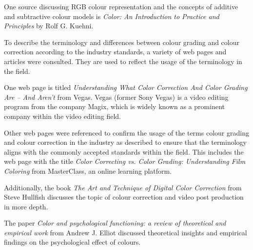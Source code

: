 \documentclass[../MasterThesis.tex]{subfiles}
\begin{document}
	
	\begin{description}[font=\color{RedViolet!80!black}, style=nextline]
		
		\item[RGB representation] 
		
		One source discussing RGB colour representation and the concepts of additive and subtractive colour models is \textit{Color: An Introduction to Practice and Principles} by Rolf G. Kuehni.~\cite{colourRGB}
		
		
		
		
		\item[Colour grading] 
		
		To describe the terminology and differences between colour grading and colour correction according to the industry standards, a variety of web pages and articles were consulted. They are used to reflect the usage of the terminology in the field. 
		
		One web page is titled \textit{Understanding What Color Correction And Color Grading Are – And Aren’t} from Vegas. Vegas (former Sony Vegas) is a video editing program from the company Magix, which is widely known as a prominent company within the video editing field.~\cite{cc_cg_1}
		
		Other web pages were referenced to confirm the usage of the terms colour grading and colour correction in the industry as described to ensure that the terminology aligns with the commonly accepted standards within the field. This includes the web page with the title \textit{Color Correcting vs. Color Grading: Understanding Film Coloring} from MasterClass, an online learning platform.~\cite{cc_cg_2} 
		
		
		Additionally, the book \textit{The Art and Technique of Digital Color Correction} from Steve Hullfish discusses the topic of colour correction and video post production in more depth.~\cite{cc1}
		
		
		
		\item[Effects of different colour]
		
		
		The paper \textit{Color and psychological functioning: a review of theoretical and empirical work} from Andrew J. Elliot discussed theoretical insights and empirical findings on the psychological effect of colours.~\cite{colour}
		

\end{description}
\end{document}
